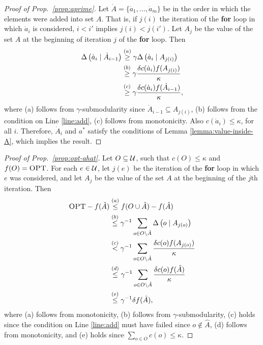 \begin{proof}[Proof of Prop.~\ref{prop:aprime}]
  Let $\dot A = \{\dot a_1, \ldots, \dot a_m \}$ be in the order in which the elements were added into set $A$.
  That is, if $j(i)$ the iteration of the \textbf{for} loop in which $\dot a_i$ is considered, $i < i'$ implies
  $j(i) < j(i')$. Let $A_j$ be the value of the set $A$ at the beginning of iteration $j$ of the \textbf{for}
  loop.
  Then
  \begin{align*}
    \Delta \left(  \dot a_i  \mid  \dot A_{i-1}  \right) &\overset{(a)}{\ge} \gamma \Delta \left(  \dot a_i  \mid  A_{j(i)}  \right) \\
                                       &\overset{(b)}{\ge} \gamma \frac{ \delta c( \dot a_i ) f( A_{j(i)} )}{\kappa} \\
                                       &\overset{(c)}{\ge} \gamma \frac{ \delta c( \dot a_i ) f( \dot A_{i - 1} )}{\kappa},
  \end{align*}
  where (a) follows from $\gamma$-submodularity since $\dot A_{i-1} \subseteq A_{j(i)}$,
  (b) follows from the condition on Line \ref{line:add},
  (c) follows from monotonicity.
  Also $c(\dot a_i ) \le \kappa$, for all $i$. Therefore, $\dot A_i$ and $a^*$ satisfy the conditions of
  Lemma \ref{lemma:value-inside-A}, which implies the result.
\end{proof}

\begin{proof}[Proof of Prop.~\ref{prop:opt-ahat}]
  Let $O \subseteq \mathcal{U}$, such that $c(O) \le \kappa$ and $f(O) = \textsc{OPT}$.
  For each $e \in \mathcal{U}$, let $j(e)$ be the iteration of the \textbf{for}
  loop in which $e$ was considered, and let $A_j$ be the value of the set
  $A$ at the beginning of the $j$th iteration.
  Then
  \begin{align*}
    \textsc{OPT} - f( \hat A ) &\overset{(a)}{\le } f( O \cup \hat A ) - f( \hat A) \\
                       &\overset{(b)}{\le } \gamma^{-1} \sum_{o \in O \setminus \hat A} \Delta \left( o \mid  A_{j(o)}  \right) \\
                       &\overset{(c)}{<} \gamma^{-1} \sum_{o \in O \setminus \hat A} \frac{\delta c(o) f(A_{j(o)})}{\kappa } \\
                       &\overset{(d)}{\le} \gamma^{-1} \sum_{o \in O \setminus \hat A} \frac{\delta c(o) f( \hat A )}{\kappa } \\
                       &\overset{(e)}{\le} \gamma^{-1} \delta f( \hat A ),
  \end{align*}
  where (a) follows from monotonicity,
  (b) follows from $\gamma$-submodularity,
  (c) holds since the condition on Line \ref{line:add} must have failed since $o \not \in \hat A$,
  (d) follows from monotonicity, and (e) holds since $\sum_{o \in O} c(o) \le \kappa$.
\end{proof}

